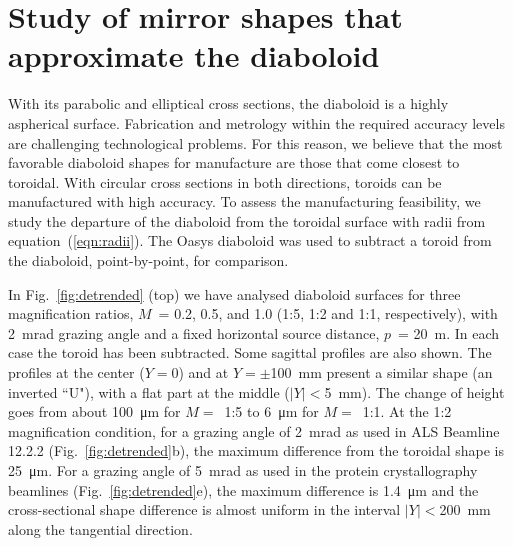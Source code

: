 \documentclass[preprint]{iucr}       %
\newcommand{\inred}[1]{{\color{red}#1}}
\begin{document}
\section{Study of mirror shapes that approximate the diaboloid}
\label{sec:approximatedShapes}

With its parabolic and elliptical cross sections, the diaboloid is a highly aspherical surface. Fabrication and metrology within the required accuracy levels are challenging technological problems. For this reason, we believe that the most favorable diaboloid shapes for manufacture are those that come closest to toroidal. With circular cross sections in both directions, toroids can be manufactured with high accuracy. To assess the manufacturing feasibility, we study the departure of the diaboloid from the toroidal surface with radii from equation~(\ref{eqn:radii}). The Oasys diaboloid was used to subtract a toroid from the diaboloid, point-by-point, for comparison.

In Fig.~\ref{fig:detrended} \inred{(top)} we have analysed diaboloid surfaces for three magnification ratios, $M$~= 0.2, 0.5, and 1.0 (1:5, 1:2 and 1:1\inred{, respectively}), with \SI{2}{\milli\radian} grazing angle and a fixed \inred{horizontal} source distance, $p$~= \SI{20}{\meter}. In each case the toroid has been subtracted. Some sagittal profiles are also shown. 
\inred{The profiles at the center ($Y=0$) and at $Y=\pm$\SI{100}{\milli\meter} present a similar shape (an inverted ``U"), with a flat part at the middle ($|Y|<$\SI{5}{\milli\meter}).
The change of height goes from about \SI{100}{\micro\meter} for $M=$~1:5 to \SI{6}{\micro\meter} for $M=$~1:1. 
}
At the 1:2 magnification condition, for a grazing angle of \SI{2}{\milli\radian} as used in ALS Beamline 12.2.2 (Fig.~\ref{fig:detrended}\inred{b}), the maximum difference from the toroidal shape is \SI{25}{\micro\meter}. For a grazing angle of \SI{5}{\milli\radian} as used in the protein crystallography beamlines (Fig.~\ref{fig:detrended}\inred{e}), the maximum difference is \SI{1.4}{\micro\meter} and the cross-sectional shape difference is almost uniform in the interval \inred{$|Y|<$\SI{200}{\milli\meter} along the} tangential direction.
\end{document}
